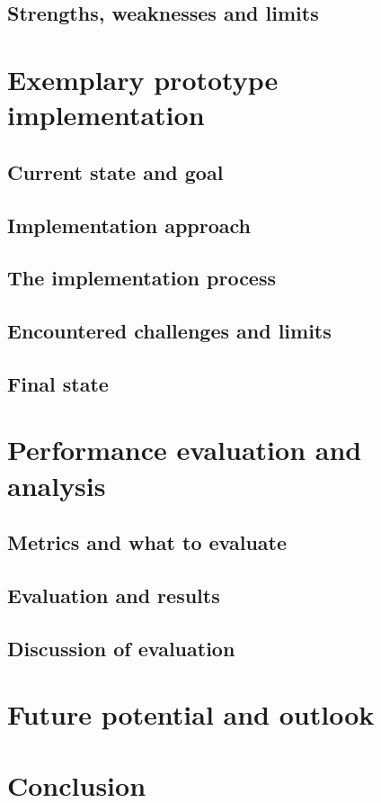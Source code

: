 \documentclass[12pt, a4paper]{article}
\begin{document}
    \subsection{Strengths, weaknesses and limits}
\section{Exemplary prototype implementation}
    \subsection{Current state and goal}
    \subsection{Implementation approach}
    \subsection{The implementation process}
    \subsection{Encountered challenges and limits}
    \subsection{Final state}
\section{Performance evaluation and analysis}
    \subsection{Metrics and what to evaluate}
    \subsection{Evaluation and results}
    \subsection{Discussion of evaluation}
\section{Future potential and outlook}
\section{Conclusion}
\end{document}
